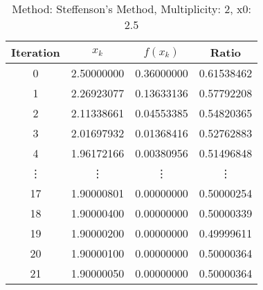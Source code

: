 \begin{table}
\centering
\caption{Method: Steffenson's Method, Multiplicity: 2, x0: 2.5}
\label{tab:table_Steffenson's_Method_2_2_5}
\begin{tabular}{c c c c}
\toprule
Iteration &      $x_k$ &   $f(x_k)$ &      Ratio \\
\midrule
        0 & 2.50000000 & 0.36000000 & 0.61538462 \\
        1 & 2.26923077 & 0.13633136 & 0.57792208 \\
        2 & 2.11338661 & 0.04553385 & 0.54820365 \\
        3 & 2.01697932 & 0.01368416 & 0.52762883 \\
        4 & 1.96172166 & 0.00380956 & 0.51496848 \\
   \vdots &     \vdots &     \vdots &     \vdots \\
       17 & 1.90000801 & 0.00000000 & 0.50000254 \\
       18 & 1.90000400 & 0.00000000 & 0.50000339 \\
       19 & 1.90000200 & 0.00000000 & 0.49999611 \\
       20 & 1.90000100 & 0.00000000 & 0.50000364 \\
       21 & 1.90000050 & 0.00000000 & 0.50000364 \\
\bottomrule
\end{tabular}
\end{table}
